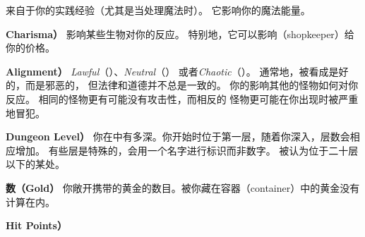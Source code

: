 \documentclass[a4paper, 10pt]{article}
\newcommand{\bb}[1]{\bf #1 \hfill}
\begin{document}
\zhTransWisdom{}来自于你的实践经验（尤其是当处理魔法时）。
它影响你的魔法能量。
\item[\bb{\zhTransCharisma{\rm （}Charisma{\rm ）}}]
\zhTransCharisma{}影响某些生物对你的反应。
特别地，它可以影响\zhTransShopkeeper{}（shopkeeper）给你的价格。
\item[\bb{\zhTransAlignment{\rm （}Alignment{\rm ）}}]
%
{\it Lawful}（\zhTransLawful）、{\it Neutral\/}（\zhTransNeutral）
或者{\it Chaotic}（\zhTransChaotic）。
通常地，\zhTransLawful{}被看成是好的，而\zhTransChaotic{}是邪恶的，
但法律和道德并不总是一致的。
你的\zhTransAlignment{}影响其他的怪物如何对你反应。
相同\zhTransAlignment{}的怪物更有可能没有攻击性，而相反\zhTransAlignment{}的
怪物更可能在你出现时被严重地冒犯。
\item[\bb{\zhTransDungeonLevel{\rm （}Dungeon Level{\rm ）}}]
你在\zhTransDungeon{}中有多深。你开始时位于第一层，随着你深入\zhTransDungeon{}，层数会相应增加。
有些层是特殊的，会用一个名字进行标识而非数字。
\zhTransAmuletOfYendor{}被认为位于二十层以下的某处。
\item[\bb{\zhTransGold{}数{\rm （}Gold{\rm ）}}]
你敞开携带的黄金的数目。被你藏在容器（container）中的黄金没有计算在内。
\item[\bb{\zhTransHitPoints{\rm （}Hit Points{\rm ）}}]
\end{document}
